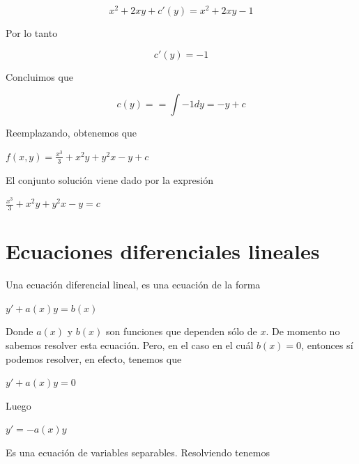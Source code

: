\documentclass{article}
\theoremstyle{plain}
\theoremstyle{definition}
\begin{document}
\begin{center}
$$x^2+2xy+c'(y)=x^2+2xy-1$$
\end{center}

Por lo tanto

\begin{center}
$$c'(y)=-1$$
\end{center}

Concluimos que

\begin{center}
$$c(y)=\displaystyle = \int -1dy = -y+c$$
\end{center}

\newpage

Reemplazando, obtenemos que

\begin{center}
$f(x,y) = \displaystyle  \frac{x^3}{3}+x^2y + y^2x	-y +c$
\end{center}


El conjunto solución viene dado por la expresión

\begin{center}
$\displaystyle  \frac{x^3}{3}+x^2y + y^2x	-y =c$
\end{center}


\newpage


\section{Ecuaciones diferenciales lineales}

Una ecuación diferencial lineal, es una ecuación de la forma

\begin{center}
$y'+a(x)y=b(x)$
\end{center}

Donde $a(x)$ y $b(x)$ son funciones que dependen sólo de $x$. De momento no sabemos resolver esta ecuación. Pero, en el caso en el cuál $b(x)=0$, entonces sí podemos resolver, en efecto, tenemos que



\begin{center}
$y'+a(x)y=0$
\end{center}

Luego

\begin{center}
$y'=-a(x)y$
\end{center}

Es una ecuación de variables separables. Resolviendo tenemos
\end{document}
